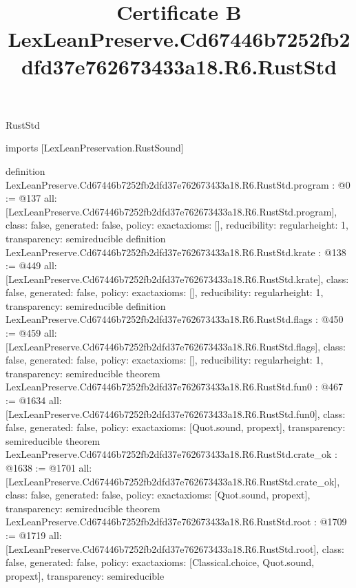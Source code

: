 \begin{lexlean}{RustStd}
\title{Certificate B LexLeanPreserve.Cd67446b7252fb2dfd37e762673433a18.R6.RustStd}
\begin{coremodule}
imports [LexLeanPreservation.RustSound]

definition LexLeanPreserve.Cd67446b7252fb2dfd37e762673433a18.R6.RustStd.program : @0 := @137 {
  all: [LexLeanPreserve.Cd67446b7252fb2dfd37e762673433a18.R6.RustStd.program],
  class: false,
  generated: false,
  policy: exact{axioms: []},
  reducibility: regular{height: 1},
  transparency: semireducible
}
definition LexLeanPreserve.Cd67446b7252fb2dfd37e762673433a18.R6.RustStd.krate : @138 := @449 {
  all: [LexLeanPreserve.Cd67446b7252fb2dfd37e762673433a18.R6.RustStd.krate],
  class: false,
  generated: false,
  policy: exact{axioms: []},
  reducibility: regular{height: 1},
  transparency: semireducible
}
definition LexLeanPreserve.Cd67446b7252fb2dfd37e762673433a18.R6.RustStd.flags : @450 := @459 {
  all: [LexLeanPreserve.Cd67446b7252fb2dfd37e762673433a18.R6.RustStd.flags],
  class: false,
  generated: false,
  policy: exact{axioms: []},
  reducibility: regular{height: 1},
  transparency: semireducible
}
theorem LexLeanPreserve.Cd67446b7252fb2dfd37e762673433a18.R6.RustStd.fun0 : @467 := @1634 {
  all: [LexLeanPreserve.Cd67446b7252fb2dfd37e762673433a18.R6.RustStd.fun0],
  class: false,
  generated: false,
  policy: exact{axioms: [Quot.sound, propext]},
  transparency: semireducible
}
theorem LexLeanPreserve.Cd67446b7252fb2dfd37e762673433a18.R6.RustStd.crate_ok : @1638 := @1701 {
  all: [LexLeanPreserve.Cd67446b7252fb2dfd37e762673433a18.R6.RustStd.crate_ok],
  class: false,
  generated: false,
  policy: exact{axioms: [Quot.sound, propext]},
  transparency: semireducible
}
theorem LexLeanPreserve.Cd67446b7252fb2dfd37e762673433a18.R6.RustStd.root : @1709 := @1719 {
  all: [LexLeanPreserve.Cd67446b7252fb2dfd37e762673433a18.R6.RustStd.root],
  class: false,
  generated: false,
  policy: exact{axioms: [Classical.choice, Quot.sound, propext]},
  transparency: semireducible
}


\end{coremodule}
\end{lexlean}
